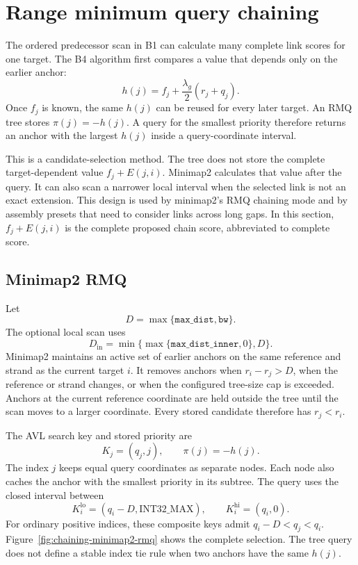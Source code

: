 
\section{Range minimum query chaining}
\label{sec:chaining-rmq-idea}

The ordered predecessor scan in B1 can calculate many complete link scores for
one target.  The B4 algorithm first compares a value that depends only on the
earlier anchor:
\begin{equation}
  h(j)=f_j+\frac{\lambda_g}{2}(r_j+q_j).
\label{eq:chaining-rmq-h}
\end{equation}
Once \(f_j\) is known, the same \(h(j)\) can be reused for every later target.
An RMQ tree stores
\(\pi(j)=-h(j)\).  A query for the smallest priority therefore returns an
anchor with the largest \(h(j)\) inside a query-coordinate interval.

This is a candidate-selection method.  The tree does not store the complete
target-dependent value \(f_j+E(j,i)\).  Minimap2 calculates that value after
the query.  It can also scan a narrower local interval when the selected link
is not an exact extension.  This design is used by minimap2's RMQ chaining
mode and by assembly presets that need to consider links across long gaps.
In this section, \(f_j+E(j,i)\) is the complete proposed chain score,
abbreviated to complete score.

\subsection{Minimap2 RMQ}
\label{sec:chaining-minimap2-rmq}

Let
\[
  D=\max\{\texttt{max\_dist},\texttt{bw}\}.
\]
The optional local scan uses
\[
  D_{\mathrm{in}}
  =\min\{\max\{\texttt{max\_dist\_inner},0\},D\}.
\]
Minimap2 maintains an active set of earlier anchors on the same reference and
strand as the current target \(i\).  It removes anchors when
\(r_i-r_j>D\), when the reference or strand changes, or when the configured
tree-size cap is exceeded.  Anchors at the current reference coordinate are
held outside the tree until the scan moves to a larger coordinate.  Every
stored candidate therefore has \(r_j<r_i\).

The AVL search key and stored priority are
\[
  K_j=(q_j,j),
  \qquad
  \pi(j)=-h(j).
\]
The index \(j\) keeps equal query coordinates as separate nodes.  Each node
also caches the anchor with the smallest priority in its subtree.  The query uses the closed
interval between
\begin{equation}
  K_i^{\mathrm{lo}}=(q_i-D,\mathrm{INT32\_MAX}),
  \qquad
  K_i^{\mathrm{hi}}=(q_i,0).
\label{eq:chaining-rmq-key-range}
\end{equation}
For ordinary positive indices, these composite keys admit
\(q_i-D<q_j<q_i\).  Figure~\ref{fig:chaining-minimap2-rmq} shows the complete
selection.
The tree query does not define a stable index tie rule when two anchors have
the same \(h(j)\).

